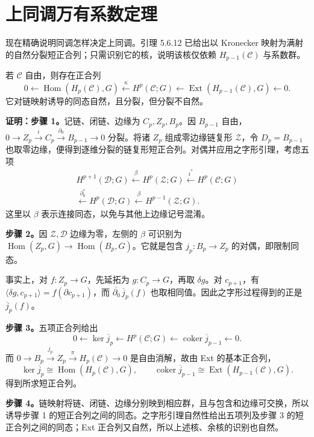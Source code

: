 \section{上同调万有系数定理}
现在精确说明同调怎样决定上同调。引理 5.6.12 已给出以 Kronecker 映射为满射的自然分裂短正合列；只需识别它的核，说明该核仅依赖 $H_{p-1}(\mathcal C)$ 与系数群。

若 $\mathcal C$ 自由，则存在正合列
\[
0\leftarrow\operatorname{Hom}(H_p(\mathcal C),G)\xleftarrow{\kappa}H^p(\mathcal C;G)
\leftarrow\operatorname{Ext}(H_{p-1}(\mathcal C),G)\leftarrow0.
\]
它对链映射诱导的同态自然，且分裂，但分裂不自然。

\textbf{证明：步骤 1。}记链、闭链、边缘为 $C_p,Z_p,B_p$。因 $B_{p-1}$ 自由，$0\to Z_p\xrightarrow{i}C_p\xrightarrow{\partial_0}B_{p-1}\to0$ 分裂。将诸 $Z_p$ 组成零边缘链复形 $\mathcal Z$，令 $D_p=B_{p-1}$ 也取零边缘，便得到逐维分裂的链复形短正合列。对偶并应用之字形引理，考虑五项
\[
\begin{split}
H^{p+1}(\mathcal D;G)\xleftarrow{\beta}H^p(\mathcal Z;G)\xleftarrow{i^*}H^p(\mathcal C;G)\\
\xleftarrow{\partial_0^*}H^p(\mathcal D;G)\xleftarrow{\beta}H^{p-1}(\mathcal Z;G).
\end{split}
\]
这里以 $\beta$ 表示连接同态，以免与其他上边缘记号混淆。

\textbf{步骤 2。}因 $\mathcal Z,\mathcal D$ 边缘为零，左侧的 $\beta$ 可识别为 $\operatorname{Hom}(Z_p,G)\to\operatorname{Hom}(B_p,G)$。它就是包含 $j_p:B_p\to Z_p$ 的对偶，即限制同态。

事实上，对 $f:Z_p\to G$，先延拓为 $g:C_p\to G$，再取 $\delta g$。对 $c_{p+1}$，有 $\langle\delta g,c_{p+1}\rangle=f(\partial c_{p+1})$，而 $\overline{\partial_0}\,\overline j_p(f)$ 也取相同值。因此之字形过程得到的正是 $\overline j_p(f)$。

\textbf{步骤 3。}五项正合列给出
\[
0\leftarrow\ker\overline j_p\leftarrow H^p(\mathcal C;G)
\leftarrow\operatorname{coker}\overline j_{p-1}\leftarrow0.
\]
而 $0\to B_p\xrightarrow{j_p}Z_p\xrightarrow{\pi}H_p(\mathcal C)\to0$ 是自由消解，故由 Ext 的基本正合列，
\[
\ker\overline j_p\cong\operatorname{Hom}(H_p(\mathcal C),G),\qquad
\operatorname{coker}\overline j_{p-1}\cong\operatorname{Ext}(H_{p-1}(\mathcal C),G).
\]
得到所求短正合列。

\textbf{步骤 4。}链映射将链、闭链、边缘分别映到相应群，且与包含和边缘可交换，所以诱导步骤 1 的短正合列之间的同态。之字形引理自然性给出五项列及步骤 3 的短正合列之间的同态；Ext 正合列又自然，所以上述核、余核的识别也自然。

